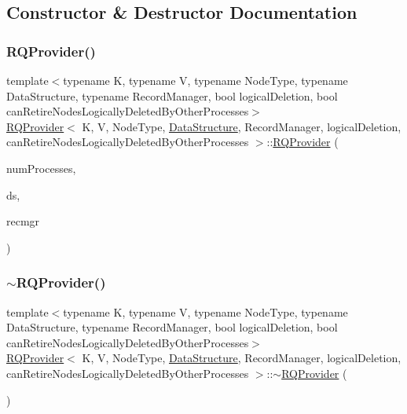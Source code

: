 \subsection{Constructor \& Destructor Documentation}
\mbox{\label{classRQProvider_a657b85f70daa72353de19671d40bbc22}} 
\subsubsection{\texorpdfstring{R\+Q\+Provider()}{RQProvider()}\hspace{0.1cm}{\footnotesize\ttfamily [1/5]}}
{\footnotesize\ttfamily template$<$typename K, typename V, typename Node\+Type, typename Data\+Structure, typename Record\+Manager, bool logical\+Deletion, bool can\+Retire\+Nodes\+Logically\+Deleted\+By\+Other\+Processes$>$ \\
\hyperlink{classRQProvider}{R\+Q\+Provider}$<$ K, V, Node\+Type, \hyperlink{classDataStructure}{Data\+Structure}, Record\+Manager, logical\+Deletion, can\+Retire\+Nodes\+Logically\+Deleted\+By\+Other\+Processes $>$\+::\hyperlink{classRQProvider}{R\+Q\+Provider} (\begin{DoxyParamCaption}\item[{const int}]{num\+Processes,  }\item[{\hyperlink{classDataStructure}{Data\+Structure} $\ast$}]{ds,  }\item[{Record\+Manager $\ast$}]{recmgr }\end{DoxyParamCaption})\hspace{0.3cm}{\ttfamily [inline]}}

\mbox{\label{classRQProvider_aefeec3df4b02ba85843f8dddd0230df8}} 
\subsubsection{\texorpdfstring{$\sim$\+R\+Q\+Provider()}{~RQProvider()}\hspace{0.1cm}{\footnotesize\ttfamily [1/5]}}
{\footnotesize\ttfamily template$<$typename K, typename V, typename Node\+Type, typename Data\+Structure, typename Record\+Manager, bool logical\+Deletion, bool can\+Retire\+Nodes\+Logically\+Deleted\+By\+Other\+Processes$>$ \\
\hyperlink{classRQProvider}{R\+Q\+Provider}$<$ K, V, Node\+Type, \hyperlink{classDataStructure}{Data\+Structure}, Record\+Manager, logical\+Deletion, can\+Retire\+Nodes\+Logically\+Deleted\+By\+Other\+Processes $>$\+::$\sim$\hyperlink{classRQProvider}{R\+Q\+Provider} (\begin{DoxyParamCaption}{ }\end{DoxyParamCaption})\hspace{0.3cm}{\ttfamily [inline]}}

